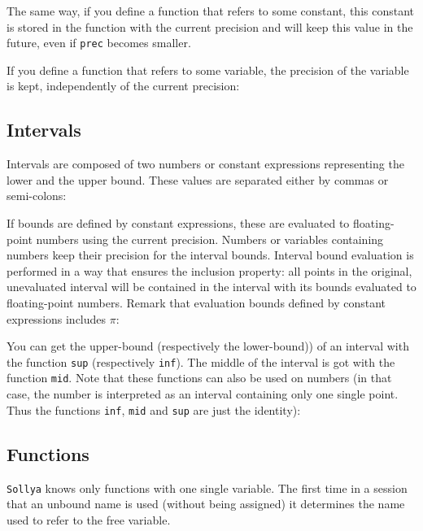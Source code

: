 \documentclass[a4paper]{article}
\newcommand{\com}[1]{\texttt{#1}}
\newcommand{\sollya}{\texttt{Sollya}\xspace}
\begin{document}
The same way, if you define a function that refers to some constant, this constant is stored in the function with the current precision and will keep this value in the future, even if \com{prec} becomes smaller.

If you define a function that refers to some variable, the precision of the variable is kept, independently of the current precision:



\subsection{Intervals}
Intervals are composed of two numbers or constant expressions representing the lower and the upper bound. These values are separated either by commas or semi-colons:



If bounds are defined by constant expressions, these are evaluated to floating-point numbers using the current precision. Numbers or variables containing numbers keep their precision for the interval bounds. Interval bound evaluation is performed in a way that ensures the inclusion property: all points
in the original, unevaluated interval will be contained in the interval with its bounds evaluated to floating-point numbers. Remark that 
evaluation bounds defined by constant expressions includes $\pi$:



You can get the upper-bound (respectively the lower-bound)) of an interval with the function \com{sup} (respectively \com{inf}). The middle of the interval is got with the function \com{mid}. Note that these functions can also be used on numbers (in that case, the number is interpreted as an interval containing only one single point. Thus the functions \com{inf}, \com{mid} and \com{sup} are just the identity):



\subsection{Functions}
\sollya knows only functions with one single variable. The first time in a session that an unbound name is used (without being assigned) it determines the name used to refer to the free variable.
\end{document}
